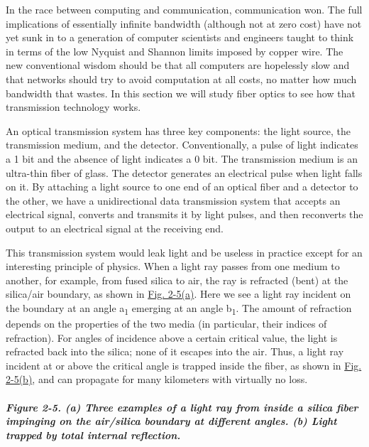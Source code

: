 In the race between computing and communication, communication won. The
full implications of essentially infinite bandwidth (although not at
zero cost) have not yet sunk in to a generation of computer scientists
and engineers taught to think in terms of the low Nyquist and Shannon
limits imposed by copper wire. The new conventional wisdom should be
that all computers are hopelessly slow and that networks should try to
avoid computation at all costs, no matter how much bandwidth that
wastes. In this section we will study fiber optics to see how that
transmission technology works.

An optical transmission system has three key components: the light
source, the transmission medium, and the detector. Conventionally, a
pulse of light indicates a 1 bit and the absence of light indicates a 0
bit. The transmission medium is an ultra-thin fiber of glass. The
detector generates an electrical pulse when light falls on it. By
attaching a light source to one end of an optical fiber and a detector
to the other, we have a unidirectional data transmission system that
accepts an electrical signal, converts and transmits it by light pulses,
and then reconverts the output to an electrical signal at the receiving
end.

This transmission system would leak light and be useless in practice
except for an interesting principle of physics. When a light ray passes
from one medium to another, for example, from fused silica to air, the
ray is refracted (bent) at the silica/air boundary, as shown in
\protect\hyperlink{0130661023_ch02lev1sec2.htmlux5cux23ch02fig05}{Fig.
2-5(a)}. Here we see a light ray incident on the boundary at an angle
{a}\textsubscript{1} emerging at an angle {b}\textsubscript{1}{.} The
amount of refraction depends on the properties of the two media (in
particular, their indices of refraction). For angles of incidence above
a certain critical value, the light is refracted back into the silica;
none of it escapes into the air. Thus, a light ray incident at or above
the critical angle is trapped inside the fiber, as shown in
\protect\hyperlink{0130661023_ch02lev1sec2.htmlux5cux23ch02fig05}{Fig.
2-5(b)}, and can propagate for many kilometers with virtually no loss.

\subparagraph[Figure 2-5. (a) Three examples of a light ray from inside
a silica fiber impinging on the air/silica boundary at different angles.
(b) Light trapped by total internal
reflection.]{\texorpdfstring{\protect\hypertarget{0130661023_ch02lev1sec2.htmlux5cux23ch02fig05}{}{}Figure
2-5. (a) Three examples of a light ray from inside a silica fiber
impinging on the air/silica boundary at different angles. (b) Light
trapped by total internal
reflection.}{Figure 2-5. (a) Three examples of a light ray from inside a silica fiber impinging on the air/silica boundary at different angles. (b) Light trapped by total internal reflection.}}

